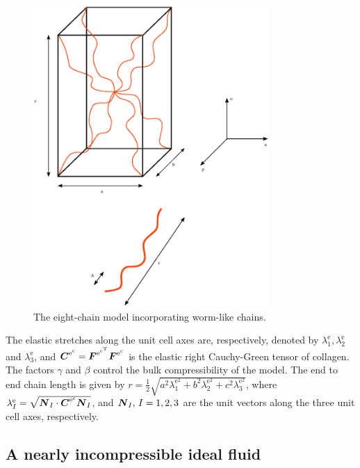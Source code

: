 \begin{figure}
  \centering {}  
    
   
  \includegraphics[width=0.8\textwidth]{images/elucidation/wlcm-cuboid}
  \caption{The eight-chain model incorporating worm-like chains.}
  \label{eight-chain-model}
\end{figure}

The elastic stretches along the unit cell axes are, respectively,
denoted by $\lambda_1^{\mathrm{e}}, \lambda_2^{\mathrm{e}}$ and
$\lambda_3^{\mathrm{e}}$, and $\mbox{\boldmath$ C$}^{\mathrm{e}^{\mathrm{c}}} =
\mbox{\boldmath$ F$}^{\mathrm{e}^{\mathrm{c}^{\mathrm{T}}}}
\mbox{\boldmath$ F$}^{\mathrm{e}^{\mathrm{c}}}$ is the elastic right Cauchy-Green
tensor of collagen. The factors $\gamma$ and $\beta$ control the bulk
compressibility of the model. The end to end chain length is given by
$r = \frac{1}{2}\sqrt{a^2\lambda_1^{\mathrm{e}^2} +
  b^2\lambda_2^{\mathrm{e}^2}+c^2\lambda_3^{\mathrm{e}^2}}$, where
$\lambda^\mathrm{e}_I =
\sqrt{\mbox{\boldmath$ N$}_I\cdot\mbox{\boldmath$ C$}^{\mathrm{e}^{\mathrm{c}}}\mbox{\boldmath$ N$}_I}$, and $\mbox{\boldmath$ N$}_I,\,I =
1,2,3$ are the unit vectors along the three unit cell axes,
respectively.

\subsection{A nearly incompressible ideal fluid}
\label{ideal-incompressible-fluid}

